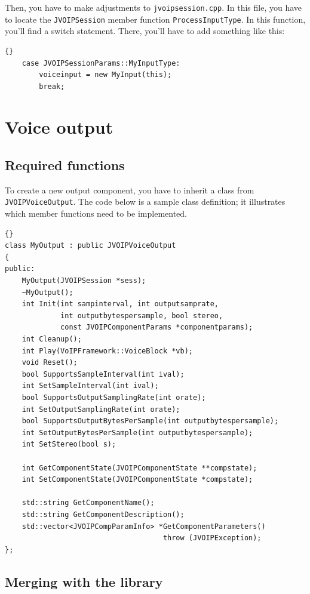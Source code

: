		Then, you have to make adjustments to {\tt jvoipsession.cpp}. In this file, you
		have to locate the {\tt JVOIPSession} member function {\tt ProcessInputType}. In
		this function, you'll find a switch statement. There, you'll have to add something
		like this:
		\begin{lstlisting}[frame=tb]{}
	case JVOIPSessionParams::MyInputType:
		voiceinput = new MyInput(this);
		break;
		\end{lstlisting}
	
	\section{Voice output}
	
		\subsection{Required functions}
		
		To create a new output component, you have to inherit a class from 
		{\tt JVOIPVoiceOutput}. The code below is a sample class definition; 
		it illustrates which member functions need to be implemented.
		\begin{lstlisting}[frame=tb]{}
class MyOutput : public JVOIPVoiceOutput
{
public:
	MyOutput(JVOIPSession *sess);
	~MyOutput();
	int Init(int sampinterval, int outputsamprate, 
	         int outputbytespersample, bool stereo,
	         const JVOIPComponentParams *componentparams);
	int Cleanup();
	int Play(VoIPFramework::VoiceBlock *vb);
	void Reset();
	bool SupportsSampleInterval(int ival);
	int SetSampleInterval(int ival);
	bool SupportsOutputSamplingRate(int orate);
	int SetOutputSamplingRate(int orate);
	bool SupportsOutputBytesPerSample(int outputbytespersample);
	int SetOutputBytesPerSample(int outputbytespersample);
	int SetStereo(bool s);
	
	int GetComponentState(JVOIPComponentState **compstate);
	int SetComponentState(JVOIPComponentState *compstate);
	
	std::string GetComponentName();
	std::string GetComponentDescription();
	std::vector<JVOIPCompParamInfo> *GetComponentParameters()
	                                 throw (JVOIPException);
};
		\end{lstlisting}

		\subsection{Merging with the library}

